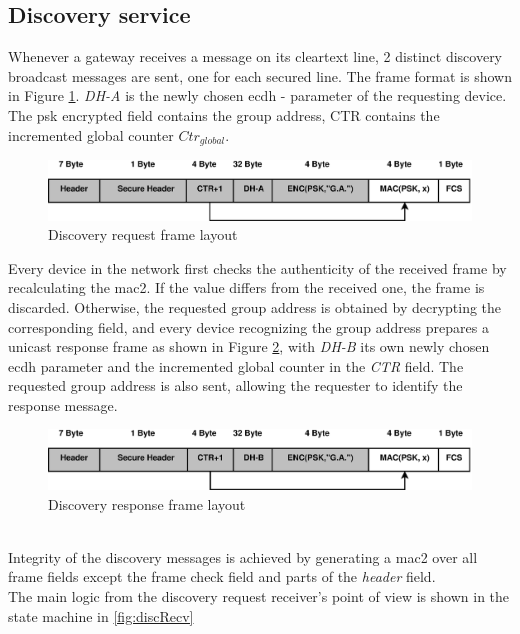 \subsection{Discovery service}
Whenever a gateway receives a message on its cleartext line, 2 distinct discovery broadcast messages are sent, one for each secured line. 
The frame format is shown in Figure \ref{fig:discReqFormat}. \textit{DH-A} is the newly chosen \gls{ecdh} - parameter of the requesting device.
The \gls{psk} encrypted field contains the group address, CTR contains the incremented global counter $Ctr_{global}$.
\begin{figure}
  \centering
    \includegraphics[width=1\textwidth]{figures/formatDiscReq.eps}
 \caption{Discovery request frame layout}
 \label{fig:discReqFormat}
\end{figure}
Every device in the network first checks the authenticity of the received frame by recalculating the \gls{mac2}. If the value differs from the received one, the frame
is discarded. Otherwise, the requested group address is obtained by decrypting the corresponding field, and 
every device recognizing the group address prepares a unicast response frame as shown in Figure \ref{fig:discResFormat}, 
with \textit{DH-B} its own newly chosen \gls{ecdh} parameter and the incremented global counter in the \textit{CTR} field. The requested group address is also
sent, allowing the requester to identify the response message.
\begin{figure}
  \centering
    \includegraphics[width=1\textwidth]{figures/formatDiscResp.eps}
 \caption{Discovery response frame layout}
 \label{fig:discResFormat}
\end{figure}
\\
Integrity of the discovery messages is achieved by generating a \gls{mac2} over all frame fields except the frame check field and parts of the \textit{header}
field. 
\\
The main logic from the discovery request receiver's point of view is shown in the state machine in \ref{fig:discRecv}

